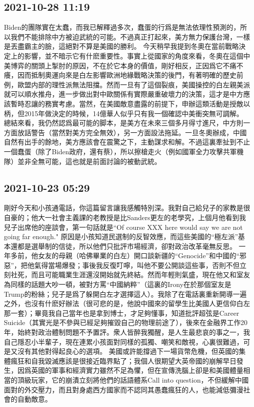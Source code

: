 \documentclass[twocolumn]{ctexart}
\begin{document}
\subsection*{2021-10-28 11:19}

Biden的團隊實在太蠢，而我已解釋過多次，蠢蛋的行爲是無法依理性預測的，所以我們不能排除中方被迫武統的可能。不過真正打起來，美方無力保護台灣，一樣是丟盡霸主的臉，這絕對不算是美國的勝利。
今天稍早我提到冬奧在當前戰略決定上的影響，並不暗示它有什麽重要性。事實上從國家的角度來看，冬奧在這個中美博弈的關頭上掣肘的原因，不在於它本身的價值，剛好相反，正因爲它不痛不癢，因而抵制奧運向來是白左影響歐洲地緣戰略決策的後門，有著明確的歷史前例，歐盟内部的理性派無法阻擋。然而一旦有了這個裂痕，美國操控的白左親美派就可以順水推舟，進一步做出對中歐關係有實際嚴重破壞力的決策，這才是中方應該暫時忍讓的務實考慮。當然，在美國敵意盡露的前提下，申辦這類活動是授敵以柄，但2015年做決定的時候，14億華人似乎只有我一個確認中美衝突無可調解。
總結來看，我仍然認爲最可能的脚本，是美方在未來三個多月得寸進尺，中方則一方面放話警告（當然對美方完全無效），另一方面設法拖延。一旦冬奧辦成，中國自然有出手的餘地，美方應該會在震驚之下，主動謀求和解。不過這裏牽扯到不止一個蠢蛋（除了Biden政府，還有蔡），所以擦槍走火（例如國軍全力攻擊共軍機隊）並非全無可能，這也就是前面討論的被動武統。
\subsection*{2021-10-23 05:29}

剛好今天和小孩通電話，你這篇留言讓我感觸特別深。我對自己給兒子的家教是很自豪的；他大一社會主義課的老教授是比Sanders更左的老學究，上個月他看到我兒子出席他的座談會，第一句話就是“Of course XXX here would say we are not going far enough." 原因是小孩知道民選制的反智效應，而這些美國的“極左派”基本還都是選舉制的信徒，所以他們只批評市場經濟，卻對政治改革毫無反思。
一年多前，他女友的母親（哈佛畢業的白左）開口談新疆的“Genocide”和中國的“邪惡”，把他氣得當場爆發；事後我反復叮嚀，叫他不要公開談這些事，否則不但立刻社死，而且可能職業生涯還沒開始就先終結。然而年輕則氣盛，現在他又和室友為同樣的話題大吵一頓，被對方罵“中國納粹”（這裏的Irony在於那個室友是Trump的粉絲；兒子是爲了躲開白左才選擇這人）。我除了在電話裏重新開導一遍之外，也沒有什麽好辦法（很可悲的是，他說中國來的留學生比美國人更信仰白左那一套）；畢竟我自己當年也是拿到博士，才足夠懂事，知道批評超弦是Career Suicide（其實光是不參與已經足夠摧毀自己的物理前途了），後來在金融界工作20年，始終對政治體制問題不予置評。衆人皆醉我獨醒，是人生最悲哀的事之一，我自己隱忍小半輩子，現在連累小孩面對同樣的孤獨、嘲笑和敵視，心裏很難過，可是又沒有其他對得起良心的選項。
美國或許能撐過下一場貨幣危機，但英國的集體瘋狂和自我毀滅應該是很接近臨界點了；我個人很期望大英帝國的崩解早日發生，因爲英國的軍事和經濟實力雖然不足為懼，但在宣傳洗腦上卻是和美國體量相當的頂級玩家，它的崩潰立刻將他們的話語體系Call into question，不但緩解中國面對的外交壓力，而且對身處西方國家而不認同其愚蠢瘋狂的人，也能減低彌漫社會的自動敵意。
\end{document}
